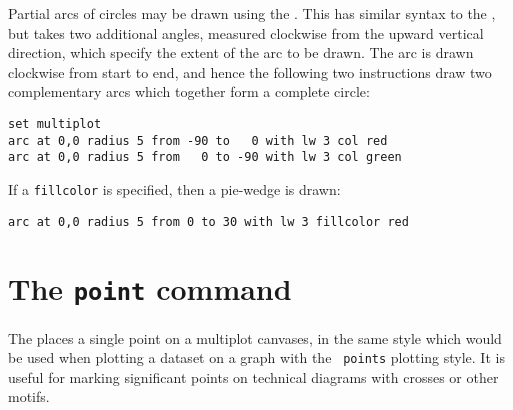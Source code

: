 Partial arcs of circles may be drawn using the . This has similar
syntax to the , but takes two additional angles, measured
clockwise from the upward vertical direction, which specify the extent of the
arc to be drawn. The arc is drawn clockwise from start to end, and hence the
following two instructions draw two complementary arcs which together form a
complete circle:

\begin{verbatim}
set multiplot
arc at 0,0 radius 5 from -90 to   0 with lw 3 col red
arc at 0,0 radius 5 from   0 to -90 with lw 3 col green
\end{verbatim}

\noindent If a {\tt fillcolor} is specified, then a pie-wedge is drawn:

\begin{verbatim}
arc at 0,0 radius 5 from 0 to 30 with lw 3 fillcolor red
\end{verbatim}



\section{The {\tt point} command}
\label{sec:point}

The  places a single point on a multiplot canvases, in the same
style which would be used when plotting a dataset on a graph with the {\tt
points} plotting style. It is useful for marking significant points on
technical diagrams with crosses or other motifs.

